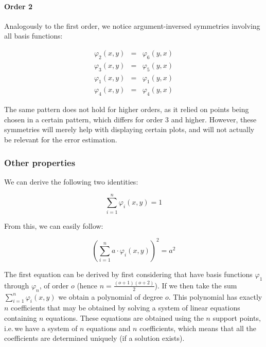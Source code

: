 \documentclass{article}
\renewcommand{\phi}{\varphi}
\begin{document}
\paragraph{Order 2}

Analogously to the first order, we notice argument-inversed symmetries involving all basis functions:

\begin{eqnarray*}
  \phi_2(x,y) & = & \phi_6(y,x) \\
  \phi_3(x,y) & = & \phi_5(y,x) \\
  \phi_1(x,y) & = & \phi_1(y,x) \\
  \phi_4(x,y) & = & \phi_4(y,x)
\end{eqnarray*}

The same pattern does not hold for higher orders, as it relied on points being chosen in a certain pattern, which differs for order 3 and higher. However, these symmetries will merely help with displaying certain plots, and will not actually be relevant for the error estimation.

\subsubsection{Other properties}
\label{sec:basis-functions-other-properties}

We can derive the following two identities:

\begin{equation}
  \label{eq:sum-basis-functions-is-1}
  \sum_{i=1}^n \phi_i(x,y) = 1
\end{equation}

From this, we can easily follow:

\begin{equation}
  \label{eq:sum-basis-functions-squared}
  \left( \sum_{i=1}^n a \cdot \phi_i(x,y) \right)^2 = a^2
\end{equation}

The first equation can be derived by first considering that have basis functions $\phi_1$ through $\phi_n$, of order $o$ (hence $n=\frac{(o+1)(o+2)}{2}$). If we then take the sum $\sum_{i=1}^n \phi_i(x,y)$ we obtain a polynomial of degree $o$. This polynomial has exactly $n$ coefficients that may be obtained by solving a system of linear equations containing $n$ equations. These equations are obtained using the $n$ support points, i.e.\,we have a system of $n$ equations and $n$ coefficients, which means that all the coefficients are determined uniquely (if a solution exists).
\end{document}
